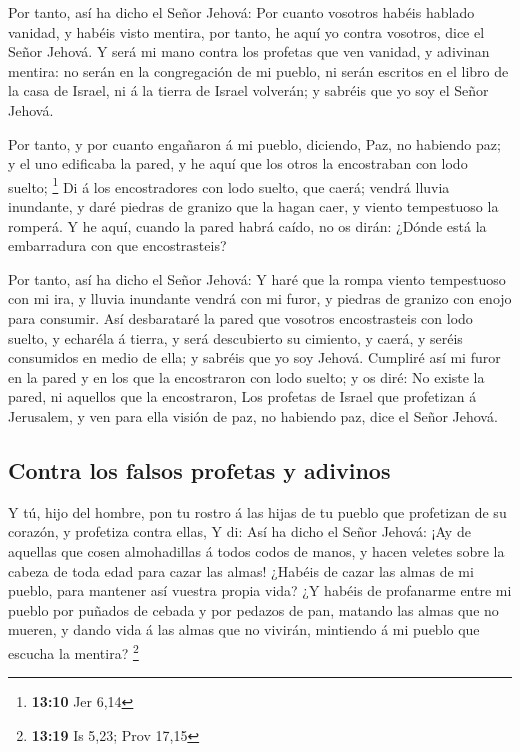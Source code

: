 Por tanto, así ha dicho el Señor Jehová: Por cuanto
vosotros habéis hablado vanidad, y habéis visto mentira, por tanto, he
aquí yo contra vosotros, dice el Señor Jehová.  Y será mi
mano contra los profetas que ven vanidad, y adivinan mentira: no serán
en la congregación de mi pueblo, ni serán escritos en el libro de la
casa de Israel, ni á la tierra de Israel volverán; y sabréis que yo soy
el Señor Jehová.

 Por tanto, y por cuanto engañaron á mi pueblo, diciendo,
Paz, no habiendo paz; y el uno edificaba la pared, y he aquí que los
otros la encostraban con lodo suelto; \footnote{\textbf{13:10} Jer 6,14}
 Di á los encostradores con lodo suelto, que caerá; vendrá
lluvia inundante, y daré piedras de granizo que la hagan caer, y viento
tempestuoso la romperá.  Y he aquí, cuando la pared habrá
caído, no os dirán: ¿Dónde está la embarradura con que encostrasteis?

 Por tanto, así ha dicho el Señor Jehová: Y haré que la
rompa viento tempestuoso con mi ira, y lluvia inundante vendrá con mi
furor, y piedras de granizo con enojo para consumir.  Así
desbarataré la pared que vosotros encostrasteis con lodo suelto, y
echaréla á tierra, y será descubierto su cimiento, y caerá, y seréis
consumidos en medio de ella; y sabréis que yo soy Jehová. 
Cumpliré así mi furor en la pared y en los que la encostraron con lodo
suelto; y os diré: No existe la pared, ni aquellos que la encostraron,
 Los profetas de Israel que profetizan á Jerusalem, y ven
para ella visión de paz, no habiendo paz, dice el Señor Jehová.

\hypertarget{contra-los-falsos-profetas-y-adivinos}{%
\subsection{Contra los falsos profetas y
adivinos}\label{contra-los-falsos-profetas-y-adivinos}}

 Y tú, hijo del hombre, pon tu rostro á las hijas de tu
pueblo que profetizan de su corazón, y profetiza contra ellas,
 Y di: Así ha dicho el Señor Jehová: ¡Ay de aquellas que
cosen almohadillas á todos codos de manos, y hacen veletes sobre la
cabeza de toda edad para cazar las almas! ¿Habéis de cazar las almas de
mi pueblo, para mantener así vuestra propia vida?  ¿Y
habéis de profanarme entre mi pueblo por puñados de cebada y por pedazos
de pan, matando las almas que no mueren, y dando vida á las almas que no
vivirán, mintiendo á mi pueblo que escucha la mentira? \footnote{\textbf{13:19}
  Is 5,23; Prov 17,15}

